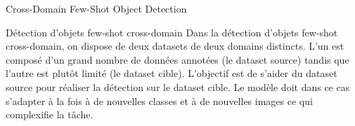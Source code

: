 \begin{subsectionframemod}{Cross-Domain Few-Shot Object Detection}

    \begin{alertblock}{Détection d'objets few-shot cross-domain}
        Dans la détection d'objets few-shot cross-domain, on dispose de deux datasets de deux domains distincts.
        L'un est composé d'un grand nombre de données annotées (le dataset source) tandis que l'autre est plutôt limité (le dataset cible).
        L'objectif est de s'aider du dataset source pour réaliser la détection sur le dataset cible.
        Le modèle doit dans ce cas s'adapter à la fois à de nouvelles classes et à de nouvelles images ce qui complexifie la tâche.
    \end{alertblock}


\end{subsectionframemod}
